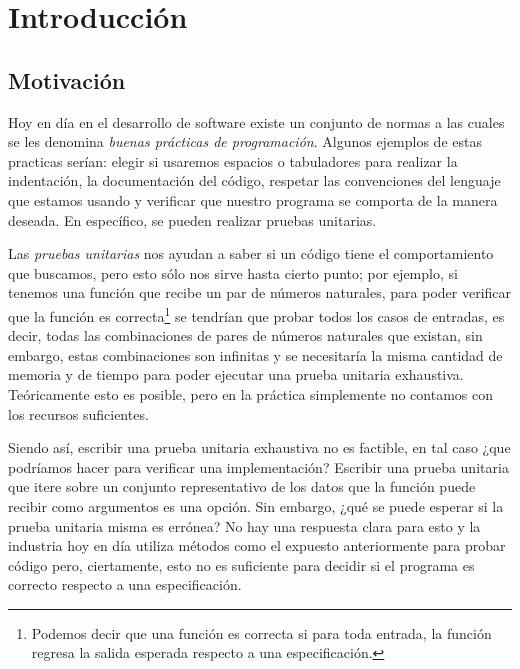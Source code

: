 \chapter{Introducción}

\section{Motivación}
\label{motivation}
Hoy en día en el desarrollo de software existe un conjunto de normas a las cuales se les 
denomina \textit{buenas pr\'acticas de programaci\'on}. Algunos ejemplos de estas practicas ser\'ian: elegir si usaremos espacios o tabuladores para realizar la 
indentaci\'on, la documentaci\'on del c\'odigo, respetar las convenciones del lenguaje que estamos 
usando y verificar que nuestro programa se comporta de la manera deseada. En espec\'ifico, se pueden 
realizar pruebas unitarias.

Las \textit{pruebas unitarias} nos ayudan a saber si un código tiene el comportamiento
que buscamos, pero esto s\'olo nos sirve hasta cierto punto; por ejemplo, si tenemos una funci\'on
que recibe un par de números naturales, para poder verificar que la funci\'on es correcta\footnote{Podemos decir que una funci\'on es correcta si para toda entrada, la funci\'on regresa la salida esperada respecto a una especificaci\'on.} se 
tendrían que probar todos los casos de entradas, es decir, todas las combinaciones de pares de 
números naturales que existan, sin embargo, estas combinaciones son infinitas y se necesitaría la 
misma cantidad de memoria y de tiempo para poder ejecutar una prueba unitaria exhaustiva. 
Teóricamente esto es posible, pero en la pr\'actica simplemente no contamos con los recursos 
suficientes.

Siendo as\'i, escribir una prueba unitaria exhaustiva no es factible, en tal caso ¿que podríamos
hacer para verificar una implementaci\'on? Escribir una prueba unitaria que itere sobre un conjunto
representativo de los datos que la funci\'on puede recibir como argumentos es una opci\'on. Sin embargo, ¿qu\'e se 
puede esperar si la prueba unitaria misma es errónea? No hay una respuesta clara para esto y la 
industria hoy en día utiliza métodos como el expuesto anteriormente para probar c\'odigo pero, 
ciertamente, esto no es suficiente para decidir si el programa es correcto respecto a una 
especificaci\'on.

